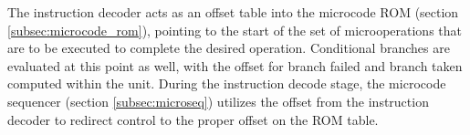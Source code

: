 \label{subsec:idecoder}
The instruction decoder acts as an offset table into the microcode ROM (section
\ref{subsec:microcode_rom}), pointing to the start of the set of
microoperations that are to be executed to complete the desired operation.
Conditional branches are evaluated at this point as well, with the offset for
branch failed and branch taken computed within the unit. During the instruction
decode stage, the microcode sequencer (section \ref{subsec:microseq})
utilizes the offset from the instruction decoder to redirect control to the
proper offset on the ROM table.

